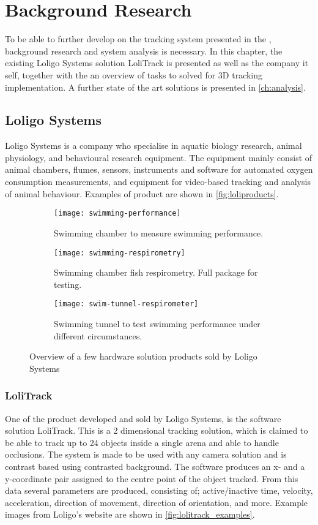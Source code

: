 \graphicspath{{figures/research/}}
\chapter{Background Research}\glsresetall
\label{cha:research}
To be able to further develop on the tracking system presented in the , background research and system analysis is necessary. In this chapter, the existing Loligo Systems solution LoliTrack is presented as well as the company it self, together with the an overview of tasks to solved for 3D tracking implementation. A further state of the art solutions is presented in \autoref{ch:analysis}.

\section{Loligo Systems}
Loligo Systems is a company who specialise in aquatic biology research, animal physiology, and  behavioural research equipment. The equipment mainly consist of animal chambers, flumes, sensors, instruments and software for automated oxygen consumption measurements, and equipment for video-based tracking and analysis of animal behaviour. Examples of product are shown in \autoref{fig:loliproducts}.

\begin{figure}[H]
	\centering
	\begin{subfigure}{0.33\textwidth}
		\texttt{[image: swimming-performance]}
		\caption{Swimming chamber to measure swimming performance.}
	\end{subfigure}
	\begin{subfigure}{0.33\textwidth}
		\texttt{[image: swimming-respirometry]}
		\caption{Swimming chamber fish respirometry. Full package for testing.}
	\end{subfigure}
	\begin{subfigure}{0.32\textwidth}
		\texttt{[image: swim-tunnel-respirometer]}
		\caption{Swimming tunnel to test swimming performance under different circumstances.}
	\end{subfigure}
\caption{Overview of a few hardware solution products sold by Loligo Systems}
\label{fig:loliproducts}
\end{figure}

\subsection{LoliTrack}
One of the product developed and sold by Loligo Systems, is the software solution LoliTrack. This is a 2 dimensional tracking solution, which is claimed to be able to track up to 24 objects inside a single arena and able to handle occlusions. The system is made to be used with any camera solution and is contrast based using contrasted background. The software produces an x- and a y-coordinate pair assigned to the centre point of the object tracked. From this data several parameters are produced, consisting of; active/inactive time, velocity, acceleration, direction of movement, direction of orientation, and more. Example images from Loligo's website are shown in \autoref{fig:lolitrack_examples}.

